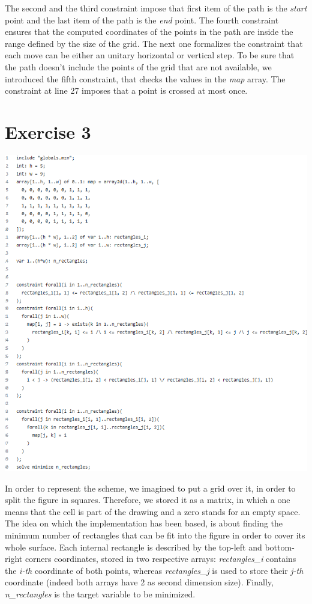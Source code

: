\documentclass{article}
\begin{document}
The second and the third constraint impose that first item of the path is the \textit{start} point and the last item of
the path is the \textit{end} point. 
The fourth constraint ensures that the computed coordinates of the points in the path are inside the range defined
by the size of the grid. The next one formalizes the constraint that each move can be either an unitary horizontal or vertical step.
To be sure that the path doesn't include the points of the grid that are not available, we introduced the fifth constraint,
that checks the values in the \textit{map} array.
The constraint at line 27 imposes that a point is crossed at most once.

\section{Exercise 3}
\vspace{0.2cm}
\includegraphics[width=\linewidth]{img/Es3.png}
\vspace{0.2cm}

In order to represent the scheme, we imagined to put a grid over it, in order to split
the figure in squares. Therefore, we stored it as a matrix, in which a one means that the cell
is part of the drawing and a zero stands for an empty space.
The idea on which the implementation has been based, is about finding the minimum number of rectangles
that can be fit into the figure in order to cover its whole surface. Each internal rectangle is described
by the top-left and bottom-right corners coordinates, stored in two respective arrays: \textit{rectangles\_i} contains
the \textit{i-th} coordinate of both points, whereas \textit{rectangles\_j} is used to store their \textit{j-th} coordinate
(indeed both arrays have 2 as second dimension size). Finally, \textit{n\_rectangles} is the target variable to be minimized.
\end{document}
